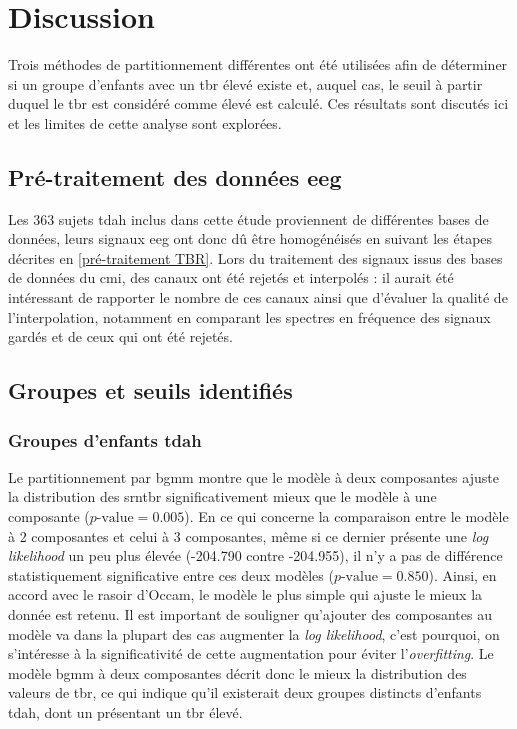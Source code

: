 \section{Discussion}

Trois méthodes de partitionnement différentes ont été utilisées afin de déterminer si un groupe d'enfants avec un \gls{tbr} élevé existe et, auquel cas, 
le seuil à partir duquel le \gls{tbr} est considéré comme élevé est calculé. Ces résultats sont discutés ici et les limites de cette analyse sont 
explorées.

\subsection{Pré-traitement des données \gls{eeg}}

Les 363 sujets \gls{tdah} inclus dans cette étude proviennent de différentes bases de données, leurs signaux \gls{eeg} ont donc dû être homogénéisés 
en suivant les étapes décrites en \ref{pré-traitement TBR}. Lors du traitement des signaux issus des bases de données du \gls{cmi}, des canaux ont 
été rejetés et interpolés : il aurait été intéressant de rapporter le nombre de ces canaux ainsi que d'évaluer la qualité de l'interpolation, notamment 
en comparant les spectres en fréquence des signaux gardés et de ceux qui ont été rejetés. 

\subsection{Groupes et seuils identifiés}

\subsubsection{Groupes d'enfants \gls{tdah}}

Le partitionnement par \gls{bgmm} montre que le modèle à deux composantes ajuste la distribution des \gls{srntbr} significativement mieux que le modèle
à une composante ($p\text{-value} = 0.005$). En ce qui concerne la comparaison entre le modèle à 2 composantes et celui à 3 composantes, même si ce dernier présente 
une \textit{log likelihood} un peu plus élevée (-204.790 contre -204.955), il n'y a pas de différence statistiquement significative entre ces deux modèles ($p\text{-value}
= 0.850$). Ainsi, en accord avec le rasoir d'Occam, le modèle le plus simple qui ajuste le mieux la donnée est retenu. Il est important de souligner
qu'ajouter des composantes au modèle va dans la plupart des cas augmenter la \textit{log likelihood}, c'est pourquoi, on s'intéresse à 
la significativité de cette augmentation pour éviter l'\textit{overfitting}. Le modèle \gls{bgmm} à deux composantes décrit donc le mieux la distribution
des valeurs de \gls{tbr}, ce qui indique qu'il existerait deux groupes distincts d'enfants \gls{tdah}, dont un présentant un \gls{tbr} élevé.

